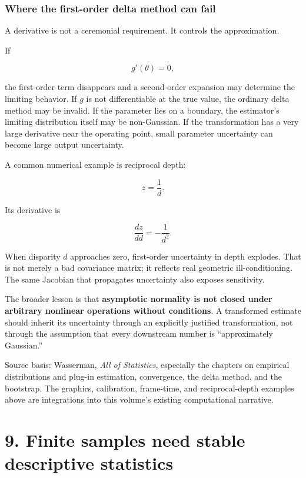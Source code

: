 \subsubsection{Where the first-order delta method can fail}\label{02-foundations-ii-ch030-where-the-first-order-delta-method-can-fail}

\hypertarget{02-foundations-ii-ch030-where-the-first-order-delta-method-can-fail}{}

A derivative is not a ceremonial requirement. It controls the approximation.

If

\[
g'(\theta)=0,
\]

the first-order term disappears and a second-order expansion may determine the limiting behavior. If \(g\) is not differentiable at the true value, the ordinary delta method may be invalid. If the parameter lies on a boundary, the estimator's limiting distribution itself may be non-Gaussian. If the transformation has a very large derivative near the operating point, small parameter uncertainty can become large output uncertainty.

A common numerical example is reciprocal depth:

\[
z=\frac1d.
\]

Its derivative is

\[
\frac{dz}{dd}=-\frac1{d^2}.
\]

When disparity \(d\) approaches zero, first-order uncertainty in depth explodes. That is not merely a bad covariance matrix; it reflects real geometric ill-conditioning. The same Jacobian that propagates uncertainty also exposes sensitivity.

The broader lesson is that \textbf{asymptotic normality is not closed under arbitrary nonlinear operations without conditions}. A transformed estimate should inherit its uncertainty through an explicitly justified transformation, not through the assumption that every downstream number is ``approximately Gaussian.''

Source basis: Wasserman, \emph{All of Statistics}, especially the chapters on empirical distributions and plug-in estimation, convergence, the delta method, and the bootstrap. The graphics, calibration, frame-time, and reciprocal-depth examples above are integrations into this volume's existing computational narrative.

\section{9. Finite samples need stable descriptive statistics}\label{02-foundations-ii-ch030-finite-samples-need-stable-descriptive-statistics}

